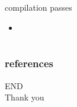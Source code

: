\documentclass[aspectratio=1610]{beamer}
\begin{document}
\begin{frame}{compilation passes}
  \begin{itemize}
    \item 
  \end{itemize}
\end{frame}
\section*{}
\begin{frame}
	\frametitle{references}
	\printbibliography
\end{frame}
\begin{frame}
\centering
\Huge{END\\Thank you}
\end{frame}
\end{document}
